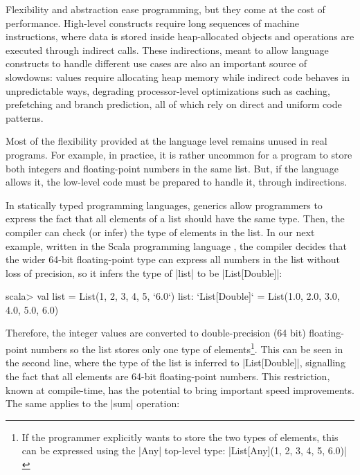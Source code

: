 Flexibility and abstraction ease programming, but they come at the cost of performance. High-level constructs require long sequences of machine instructions, where data is stored inside heap-allocated objects and operations are executed through indirect calls. These indirections, meant to allow language constructs to handle different use cases are also an important source of slowdowns: values require allocating heap memory while indirect code behaves in unpredictable ways, degrading processor-level optimizations such as caching, prefetching and branch prediction, all of which rely on direct and uniform code patterns. %

Most of the flexibility provided at the language level remains unused in real programs. For example, in practice, it is rather uncommon for a program to store both integers and floating-point numbers in the same list. But, if the language allows it, the low-level code must be prepared to handle it, through indirections.

In statically typed programming languages, generics allow programmers to express the fact that all elements of a list should have the same type. Then, the compiler can check (or infer) the type of elements in the list. In our next example, written in the Scala programming language \cite{scala-odersky}, the compiler decides that the wider 64-bit floating-point type can express all numbers in the list without loss of precision, so it infers the type of |list| to be |List[Double]|:

\begin{lstlisting-nobreak}
 scala> val list = List(1, 2, 3, 4, 5, `6.0`)
 list: `List[Double]` = List(1.0, 2.0, 3.0, 4.0, 5.0, 6.0)
\end{lstlisting-nobreak}

Therefore, the integer values are converted to double-precision (64 bit) floating-point numbers so the list stores only one type of elements\footnote{If the programmer explicitly wants to store the two types of elements, this can be expressed using the |Any| top-level type: |List[Any](1, 2, 3, 4, 5, 6.0)|}. This can be seen in the second line, where the type of the list is inferred to |List[Double]|, signalling the fact that all elements are 64-bit floating-point numbers. This restriction, known at compile-time, has the potential to bring important speed improvements. The same applies to the |sum| operation:

